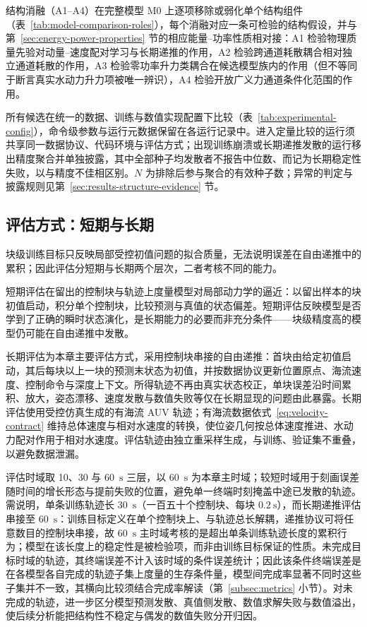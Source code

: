 结构消融（A1--A4）在完整模型 M0 上逐项移除或弱化单个结构组件（表~\ref{tab:model-comparison-roles}），每个消融对应一条可检验的结构假设，并与第~\ref{sec:energy-power-properties} 节的相应能量--功率性质相对接：A1 检验物理质量先验对动量--速度配对学习与长期递推的作用，A2 检验跨通道耗散耦合相对独立通道耗散的作用，A3 检验零功率升力类耦合在候选模型族内的作用（但不等同于断言真实水动力升力项被唯一辨识），A4 检验开放广义力通道条件化范围的作用。

所有候选在统一的数据、训练与数值实现配置下比较（表~\ref{tab:experimental-config}），命令级参数与运行元数据保留在各运行记录中。进入定量比较的运行须共享同一数据协议、代码环境与评估方式；出现训练崩溃或长期递推发散的运行移出精度聚合并单独披露，其中全部种子均发散者不报告中位数、而记为长期稳定性失败，以与精度不佳相区别。\(N\) 为排除后参与聚合的有效种子数；异常的判定与披露规则见第~\ref{sec:results-structure-evidence} 节。

\subsection{评估方式：短期与长期}
\label{subsec:rollout-eval}

块级训练目标只反映局部受控初值问题的拟合质量，无法说明误差在自由递推中的累积；因此评估分短期与长期两个层次，二者考核不同的能力。

短期评估在留出的控制块与轨迹上度量模型对局部动力学的逼近：以留出样本的块初值启动，积分单个控制块，比较预测与真值的状态偏差。短期评估反映模型是否学到了正确的瞬时状态演化，是长期能力的必要而非充分条件——块级精度高的模型仍可能在自由递推中发散。

长期评估为本章主要评估方式，采用控制块串接的自由递推：首块由给定初值启动，其后每块以上一块的预测末状态为初值，并按数据协议更新位置原点、海流速度、控制命令与深度上下文。所得轨迹不再由真实状态校正，单块误差沿时间累积、放大，姿态漂移、速度发散与数值失败等仅在长期显现的问题由此暴露。长期评估使用受控仿真生成的有海流 AUV 轨迹；有海流数据依式~\eqref{eq:velocity-contract} 维持总体速度与相对水速度的转换，使位姿几何按总体速度推进、水动力配对作用于相对水速度。评估轨迹由独立重采样生成，与训练、验证集不重叠，以避免数据泄漏。

评估时域取 10、30 与 60~\(\mathrm{s}\) 三层，以 60~\(\mathrm{s}\) 为本章主时域；较短时域用于刻画误差随时间的增长形态与提前失败的位置，避免单一终端时刻掩盖中途已发散的轨迹。需说明，单条训练轨迹长 30~\(\mathrm{s}\)（一百五十个控制块、每块 \(0.2~\mathrm{s}\)），而长期递推评估串接至 60~\(\mathrm{s}\)：训练目标定义在单个控制块上、与轨迹总长解耦，递推协议可将任意数目的控制块串接，故 60~\(\mathrm{s}\) 主时域考核的是超出单条训练轨迹长度的累积行为；模型在该长度上的稳定性是被检验项，而非由训练目标保证的性质。未完成目标时域的轨迹，其终端误差不计入该时域的条件误差统计；因此该条件终端误差是在各模型各自完成的轨迹子集上度量的生存条件量，模型间完成率显著不同时这些子集并不一致，其横向比较须结合完成率解读（第~\ref{subsec:metrics} 小节）。对未完成的轨迹，进一步区分模型预测发散、真值侧发散、数值求解失败与数值溢出，使后续分析能把结构性不稳定与偶发的数值失败分开归因。

